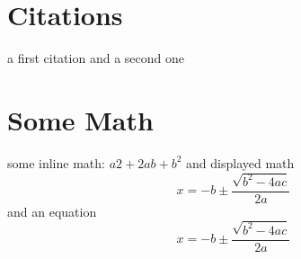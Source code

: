 \documentclass{article}
\begin{document}
\section{Citations}
a first citation \cite{aaa} and a second one \cite{bbb}

\section{Some Math}
some inline math: $a2+2ab+b^2$ and displayed math
\[ x = -b\pm \frac{\sqrt{b^2-4ac}}{2a}\]
and an equation
\begin{equation}\label{foo}
  x = -b\pm \frac{\sqrt{b^2-4ac}}{2a}
\end{equation}



\end{document}
